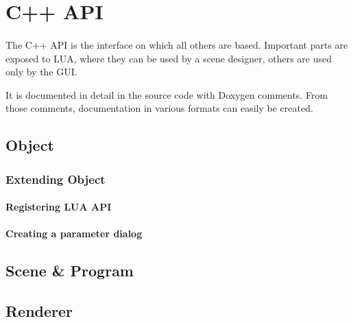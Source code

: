 \section{C++ API}
\paragraph{}
The C++ API is the interface on which all others are based.
Important parts are exposed to LUA, where they can be used by a scene designer, others are used only by the GUI.

It is documented in detail in the source code with Doxygen comments.
From those comments, documentation in various formats can easily be created.

\subsection{Object}
\paragraph{}


\subsubsection{Extending Object}
\paragraph{}


\paragraph{Registering LUA API}


\paragraph{Creating a parameter dialog}


\subsection{Scene \& Program}
\paragraph{}


\subsection{Renderer}
